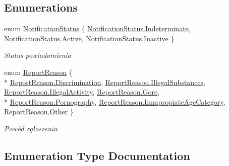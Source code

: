 \subsection*{Enumerations}
\begin{DoxyCompactItemize}
\item 
enum \hyperlink{namespace_contract_a825ee6cf36a3a102b109de3a1cbd9c26}{Notification\+Status} \{ \hyperlink{namespace_contract_a825ee6cf36a3a102b109de3a1cbd9c26aa2d00c353d1f9a5f07852650030dbd53}{Notification\+Status.\+Indeterminate}, 
\hyperlink{namespace_contract_a825ee6cf36a3a102b109de3a1cbd9c26a4d3d769b812b6faa6b76e1a8abaece2d}{Notification\+Status.\+Active}, 
\hyperlink{namespace_contract_a825ee6cf36a3a102b109de3a1cbd9c26a3cab03c00dbd11bc3569afa0748013f0}{Notification\+Status.\+Inactive}
 \}
\begin{DoxyCompactList}\small\item\em Status powiadomienia \end{DoxyCompactList}\item 
enum \hyperlink{namespace_contract_ac533e9a5fffe5319dcbdc2388bc54715}{Report\+Reason} \{ \\*
\hyperlink{namespace_contract_ac533e9a5fffe5319dcbdc2388bc54715a6c5fb76d5902956dee0c0cda6c38ddfe}{Report\+Reason.\+Discrimination}, 
\hyperlink{namespace_contract_ac533e9a5fffe5319dcbdc2388bc54715a55af0877395be017b8c5fcdab23d4d2e}{Report\+Reason.\+Illegal\+Substances}, 
\hyperlink{namespace_contract_ac533e9a5fffe5319dcbdc2388bc54715a8e333cf086491a76cfbbccec5036a92a}{Report\+Reason.\+Illegal\+Activity}, 
\hyperlink{namespace_contract_ac533e9a5fffe5319dcbdc2388bc54715aa2af13cc96c7143873db4fb2c0119e82}{Report\+Reason.\+Gore}, 
\\*
\hyperlink{namespace_contract_ac533e9a5fffe5319dcbdc2388bc54715a3a8dbbbf0eb3b9cbb7fa1dbbced57907}{Report\+Reason.\+Pornography}, 
\hyperlink{namespace_contract_ac533e9a5fffe5319dcbdc2388bc54715ac6a741672934d9cccbb71fa8def9874b}{Report\+Reason.\+Innapropiate\+Age\+Category}, 
\hyperlink{namespace_contract_ac533e9a5fffe5319dcbdc2388bc54715a6311ae17c1ee52b36e68aaf4ad066387}{Report\+Reason.\+Other}
 \}
\begin{DoxyCompactList}\small\item\em Powód zgłoszenia \end{DoxyCompactList}\end{DoxyCompactItemize}


\subsection{Enumeration Type Documentation}
\hypertarget{namespace_contract_a825ee6cf36a3a102b109de3a1cbd9c26}{}

